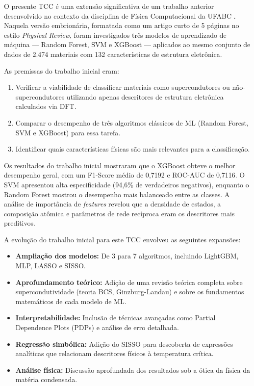 \documentclass[12pt, a4paper, oneside]{report}
\begin{document}
O presente TCC é uma extensão significativa de um trabalho anterior desenvolvido no contexto da disciplina de Física Computacional da UFABC \cite{delucca2025}. Naquela versão embrionária, formatada como um artigo curto de 5 páginas no estilo \textit{Physical Review}, foram investigados três modelos de aprendizado de máquina --- Random Forest, SVM e XGBoost --- aplicados ao mesmo conjunto de dados de 2.474 materiais com 132 características de estrutura eletrônica.

As premissas do trabalho inicial eram:
\begin{enumerate}
    \item Verificar a viabilidade de classificar materiais como supercondutores ou não-supercondutores utilizando apenas descritores de estrutura eletrônica calculados via DFT.
    \item Comparar o desempenho de três algoritmos clássicos de ML (Random Forest, SVM e XGBoost) para essa tarefa.
    \item Identificar quais características físicas são mais relevantes para a classificação.
\end{enumerate}

Os resultados do trabalho inicial mostraram que o XGBoost obteve o melhor desempenho geral, com um F1-Score médio de 0,7192 e ROC-AUC de 0,7116. O SVM apresentou alta especificidade (94,6\% de verdadeiros negativos), enquanto o Random Forest mostrou o desempenho mais balanceado entre as classes. A análise de importância de \textit{features} revelou que a densidade de estados, a composição atômica e parâmetros de rede recíproca eram os descritores mais preditivos.

A evolução do trabalho inicial para este TCC envolveu as seguintes expansões:
\begin{itemize}
    \item \textbf{Ampliação dos modelos:} De 3 para 7 algoritmos, incluindo LightGBM, MLP, LASSO e SISSO.
    \item \textbf{Aprofundamento teórico:} Adição de uma revisão teórica completa sobre supercondutividade (teoria BCS, Ginzburg-Landau) e sobre os fundamentos matemáticos de cada modelo de ML.
    \item \textbf{Interpretabilidade:} Inclusão de técnicas avançadas como Partial Dependence Plots (PDPs) e análise de erro detalhada.
    \item \textbf{Regressão simbólica:} Adição do SISSO para descoberta de expressões analíticas que relacionam descritores físicos à temperatura crítica.
    \item \textbf{Análise física:} Discussão aprofundada dos resultados sob a ótica da física da matéria condensada.
\end{itemize}
\end{document}

